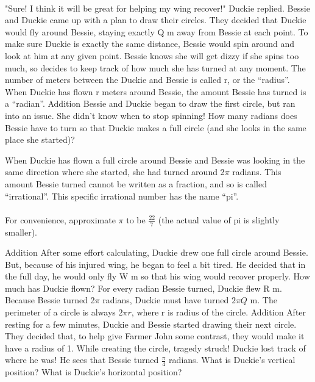 \paragraph{} "Sure! I think it will be great for helping my wing recover!" Duckie replied.
\vfill
\pagebreak
 {Bessie and Duckie came up with a plan to draw their circles. They decided that Duckie would fly around Bessie, staying exactly Q m away from Bessie at each point. To make sure Duckie is exactly the same distance, Bessie would spin around and look at him at any given point. Bessie knows she will get dizzy if she spins too much, so decides to keep track of how much she has turned at any moment.}
 {}
 {The number of meters between the Duckie and Bessie is called r, or the “radius”. When Duckie has flown r meters around Bessie, the amount Bessie has turned is a “radian”.}
 {Addition}
 {Bessie and Duckie began to draw the first circle, but ran into an issue. She didn't know when to stop spinning! How many radians does Bessie have to turn so that Duckie makes a full circle (and she looks in the same place she started)?}
 {}
 {When Duckie has flown a full circle around Bessie and Bessie was looking in the same direction where she started, she had turned around 2$\pi$ radians. This amount Bessie turned cannot be written as a fraction, and so is called “irrational”. This specific irrational number has the name “pi”. 
 \paragraph{} For convenience, approximate $\pi$ to be $\frac{22}{7}$ (the actual value of pi is slightly smaller).}
 {Addition}
 {After some effort calculating, Duckie drew one full circle around Bessie. But, because of his injured wing, he began to feel a bit tired. He decided that in the full day, he would only fly W m so that his wing would recover properly. How much has Duckie flown?}
 {For every radian Bessie turned, Duckie flew R m. Because Bessie turned 2$\pi$ radians, Duckie must have turned $2\pi Q$ m.}
 {The perimeter of a circle is always $2\pi r$, where r is radius of the circle.}
 {Addition}
 {After resting for a few minutes, Duckie and Bessie started drawing their next circle. They decided that, to help give Farmer John some contrast, they would make it have a radius of 1. While creating the circle, tragedy struck! Duckie lost track of where he was! He sees that Bessie turned $\frac{\pi}{4}$ radians. What is Duckie's vertical position? What is Duckie's horizontal position?}
